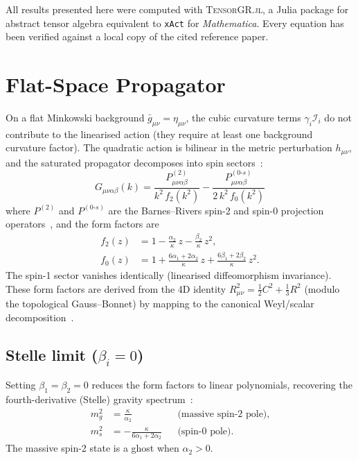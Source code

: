 \documentclass[aps,prd,twocolumn,superscriptaddress,nofootinbib]{revtex4-2}
\newcommand{\TGR}{\textsc{TensorGR.jl}}
\begin{document}
All results presented here were computed with \TGR{}, a Julia package
for abstract tensor algebra equivalent to \texttt{xAct} for
\textit{Mathematica}.  Every equation has been verified against a local
copy of the cited reference paper.

\section{Flat-Space Propagator}
\label{sec:flat}

On a flat Minkowski background $\bar g_{\mu\nu} = \eta_{\mu\nu}$, the
cubic curvature terms $\gamma_i\mathcal{I}_i$ do not contribute to the
linearised action (they require at least one background curvature
factor).  The quadratic action is bilinear in the metric perturbation
$h_{\mu\nu}$, and the saturated propagator decomposes into spin
sectors~\cite{Buoninfante2020}:
\begin{equation}\label{eq:propagator}
\boxed{
G_{\mu\nu\alpha\beta}(k)
= \frac{P^{(2)}_{\mu\nu\alpha\beta}}{k^2\,f_2(k^2)}
- \frac{P^{(0\text{-}s)}_{\mu\nu\alpha\beta}}{2\,k^2\,f_0(k^2)}
}
\end{equation}
where $P^{(2)}$ and $P^{(0\text{-}s)}$ are the Barnes--Rivers spin-2
and spin-0 projection operators~\cite{PSALTer2024}, and the form
factors are
\begin{align}
f_2(z) &= 1 - \frac{\alpha_2}{\kappa}\,z - \frac{\beta_2}{\kappa}\,z^2,
\label{eq:f2}\\[4pt]
f_0(z) &= 1 + \frac{6\alpha_1+2\alpha_2}{\kappa}\,z
           + \frac{6\beta_1+2\beta_2}{\kappa}\,z^2.
\label{eq:f0}
\end{align}
The spin-1 sector vanishes identically (linearised diffeomorphism
invariance).  These form factors are derived from the 4D identity
$R_{\mu\nu}^2 = \tfrac{1}{2}C^2 + \tfrac{1}{3}R^2$ (modulo the
topological Gauss--Bonnet) by mapping to the canonical Weyl/scalar
decomposition~\cite{Buoninfante2020}.

\subsection{Stelle limit ($\beta_i = 0$)}

Setting $\beta_1 = \beta_2 = 0$ reduces the form factors to linear
polynomials, recovering the fourth-derivative (Stelle) gravity
spectrum~\cite{Stelle1977}:
\begin{align}
m_g^2 &= \frac{\kappa}{\alpha_2}
  &&\text{(massive spin-2 pole)},\\
m_s^2 &= -\frac{\kappa}{6\alpha_1 + 2\alpha_2}
  &&\text{(spin-0 pole)}.
\end{align}
The massive spin-2 state is a ghost when $\alpha_2 > 0$.
\end{document}
